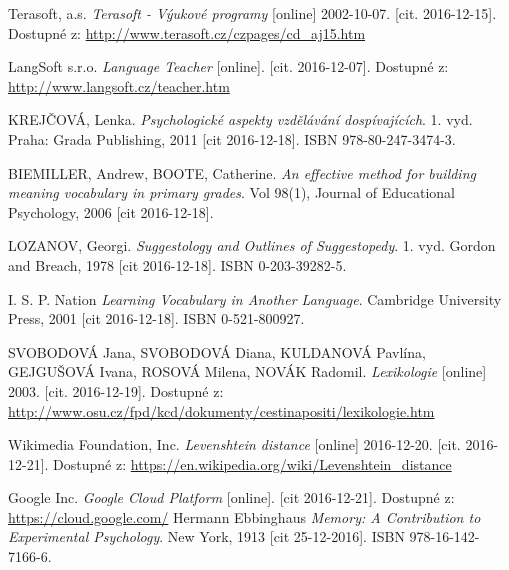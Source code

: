 \documentclass[a4paper,11pt,titlepage,fleqn]{article}
\begin{document}
\newpage
\begin{thebibliography}{99}
    

        Terasoft, a.s. \textit{Terasoft - Výukové programy} [online] 2002-10-07. [cit. 2016-12-15]. Dostupné z: \url{http://www.terasoft.cz/czpages/cd_aj15.htm}
    
        LangSoft s.r.o. \textit{Language Teacher} [online]. [cit. 2016-12-07]. Dostupné z: \url{http://www.langsoft.cz/teacher.htm}

        KREJČOVÁ, Lenka. \textit{Psychologické aspekty vzdělávání dospívajících}. 1. vyd. Praha: Grada Publishing, 2011 [cit 2016-12-18]. ISBN 978-80-247-3474-3.

        BIEMILLER, Andrew, BOOTE, Catherine. \textit{An effective method for building meaning vocabulary in primary grades}. Vol 98(1), Journal of Educational Psychology, 2006 [cit 2016-12-18].

        LOZANOV, Georgi. \textit{Suggestology and Outlines of Suggestopedy}. 1. vyd. Gordon and Breach, 1978 [cit 2016-12-18]. ISBN 0-203-39282-5.

        I. S. P. Nation \textit{Learning Vocabulary in Another Language}. Cambridge University Press, 2001 [cit 2016-12-18]. ISBN 0-521-800927.

        SVOBODOVÁ Jana, SVOBODOVÁ Diana, KULDANOVÁ Pavlína, GEJGUŠOVÁ Ivana, ROSOVÁ Milena, NOVÁK Radomil. \textit{Lexikologie} [online] 2003. [cit. 2016-12-19]. Dostupné z: \url{http://www.osu.cz/fpd/kcd/dokumenty/cestinapositi/lexikologie.htm}

         Wikimedia Foundation, Inc. \textit{Levenshtein distance} [online] 2016-12-20. [cit. 2016-12-21]. Dostupné z: \url{https://en.wikipedia.org/wiki/Levenshtein_distance}
        
        Google Inc. \textit{Google Cloud Platform} [online]. [cit 2016-12-21]. Dostupné z: \url{https://cloud.google.com/}
		Hermann Ebbinghaus \textit{Memory: A Contribution to Experimental Psychology}. New York, 1913 [cit 25-12-2016]. ISBN 978-16-142-7166-6.

\end{thebibliography}
\end{document}
